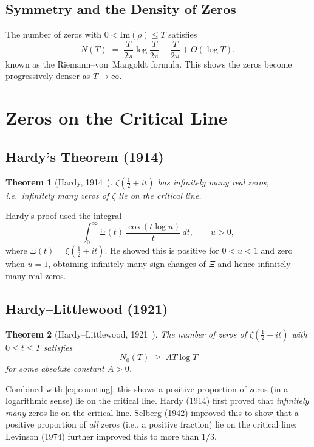 \documentclass[12pt,a4paper]{article}
\newtheorem{theorem}{Theorem}[section]
\theoremstyle{remark}
\begin{document}
\subsection{Symmetry and the Density of Zeros}

The number of zeros with $0 < \mathrm{Im}(\rho) \leq T$ satisfies
\begin{equation}\label{eq:counting}
  N(T) \;=\; \frac{T}{2\pi}\log\frac{T}{2\pi} - \frac{T}{2\pi} + O(\log T),
\end{equation}
known as the Riemann--von~Mangoldt formula.  This shows the zeros become progressively
denser as $T\to\infty$.

\section{Zeros on the Critical Line}

\subsection{Hardy's Theorem (1914)}

\begin{theorem}[Hardy, 1914~\cite{Hardy1914}]
  $\zeta(\tfrac{1}{2}+it)$ has infinitely many real zeros, i.e.\ infinitely many
  zeros of $\zeta$ lie on the critical line.
\end{theorem}

Hardy's proof used the integral
\[
  \int_0^\infty \Xi(t)\,\frac{\cos(t\log u)}{t}\,dt, \qquad u > 0,
\]
where $\Xi(t) = \xi(\tfrac{1}{2}+it)$.  He showed this is positive for $0 < u < 1$ and
zero when $u=1$, obtaining infinitely many sign changes of $\Xi$ and hence infinitely many
real zeros.

\subsection{Hardy--Littlewood (1921)}

\begin{theorem}[Hardy--Littlewood, 1921~\cite{HardyLittlewood1921}]
  The number of zeros of $\zeta(\tfrac{1}{2}+it)$ with $0 \leq t \leq T$ satisfies
  \[
    N_0(T) \;\geq\; AT\log T
  \]
  for some absolute constant $A > 0$.
\end{theorem}

Combined with \eqref{eq:counting}, this shows a positive proportion of zeros (in a
logarithmic sense) lie on the critical line. Hardy (1914) first proved that \emph{infinitely
many} zeros lie on the critical line. Selberg (1942) improved this to show that a positive
proportion of \emph{all} zeros (i.e., a positive fraction) lie on the critical line;
Levinson (1974) further improved this to more than $1/3$.
\end{document}
